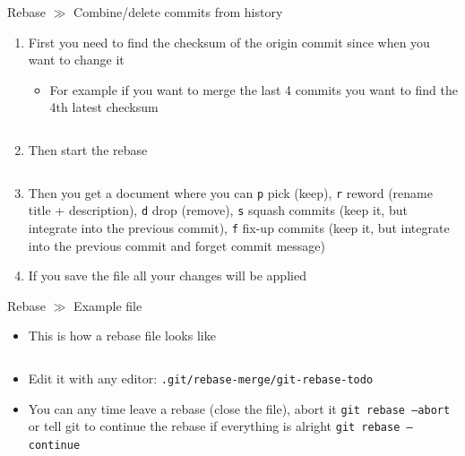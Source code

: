 \documentclass[10pt]{beamer}
\begin{document}
\begin{frame}{Rebase $\gg$ Combine/delete commits from history}
	\begin{enumerate}
		\item First you need to find the checksum of the origin commit since when you want to change it
		\begin{itemize}
			\item For example if you want to merge the last 4 commits you want to find the 4th latest checksum
		\end{itemize}
		\inputminted[bgcolor=lightGreyCustom,fontsize=\scriptsize]{sh}{./resources/git_rebase_01_checksums.sh}
		\item Then start the rebase
		\inputminted[bgcolor=lightGreyCustom,fontsize=\scriptsize]{sh}{./resources/git_rebase_02_rebase.sh}
		\item Then you get a document where you can \texttt{p} pick (keep), \texttt{r} reword (rename title + description), \texttt{d} drop (remove), \texttt{s} squash commits (keep it, but integrate into the previous commit), \texttt{f} fix-up commits (keep it, but integrate into the previous commit and forget commit message)
		\item If you save the file all your changes will be applied
	\end{enumerate}
\end{frame}

\begin{frame}{Rebase $\gg$ Example file}
	\begin{itemize}
		\item This is how a rebase file looks like
		\inputminted[bgcolor=lightGreyCustom,fontsize=\scriptsize]{sh}{./resources/git_rebase_03_example}
		\item Edit it with any editor: \texttt{.git/rebase-merge/git-rebase-todo}
		\item You can any time leave a rebase (close the file), abort it \texttt{git rebase --abort} or tell git to continue the rebase if everything is alright \texttt{git rebase --continue}
	\end{itemize}
\end{frame}
\end{document}
